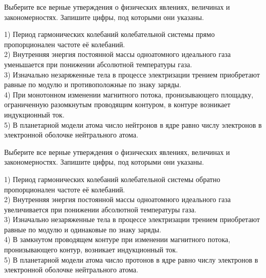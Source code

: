 \begin{taskbasic}[code={\label{task:kim18_img7}}]
Выберите все верные утверждения о физических явлениях, величинах и закономерностях. Запишите цифры, под которыми они указаны.

1) Период гармонических колебаний колебательной системы прямо пропорционален частоте её колебаний.\\
2) Внутренняя энергия постоянной массы одноатомного идеального газа уменьшается при понижении абсолютной температуры газа.\\
3) Изначально незаряженные тела в процессе электризации трением приобретают равные по модулю и противоположные по знаку заряды.\\
4) При монотонном изменении магнитного потока, пронизывающего площадку, ограниченную разомкнутым проводящим контуром, в контуре возникает индукционный ток.\\
5) В планетарной модели атома число нейтронов в ядре равно числу электронов в электронной оболочке нейтрального атома.

\end{taskbasic}

\begin{taskbasic}[code={\label{task:kim18_img8}}]
Выберите все верные утверждения о физических явлениях, величинах и закономерностях. Запишите цифры, под которыми они указаны.

1) Период гармонических колебаний колебательной системы обратно пропорционален частоте её колебаний.\\
2) Внутренняя энергия постоянной массы одноатомного идеального газа увеличивается при понижении абсолютной температуры газа.\\
3) Изначально незаряженные тела в процессе электризации трением приобретают равные по модулю и одинаковые по знаку заряды.\\
4) В замкнутом проводящем контуре при изменении магнитного потока, пронизывающего контур, возникает индукционный ток.\\
5) В планетарной модели атома число протонов в ядре равно числу электронов в электронной оболочке нейтрального атома.

\end{taskbasic}

